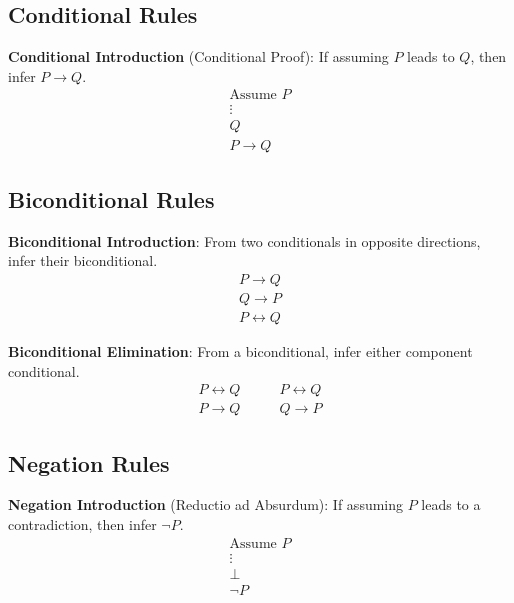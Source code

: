 \subsection{Conditional Rules}

\begin{definition}
\textbf{Conditional Introduction} (Conditional Proof): If assuming $P$ leads to
$Q$, then infer $P \rightarrow Q$.
\[
\begin{array}{l}
\text{Assume } P \\ \vdots \\ Q \\ \hline
P \rightarrow Q
\end{array}
\]
\end{definition}

\subsection{Biconditional Rules}

\begin{definition}
\textbf{Biconditional Introduction}: From two conditionals in opposite directions,
infer their biconditional.
\[
\begin{array}{l}
P \rightarrow Q \\
Q \rightarrow P \\ \hline
P \leftrightarrow Q
\end{array}
\]
\end{definition}

\begin{definition}
\textbf{Biconditional Elimination}: From a biconditional, infer either component
conditional.
\[
\begin{array}{l}
P \leftrightarrow Q \\ \hline
P \rightarrow Q
\end{array}
\qquad
\begin{array}{l}
P \leftrightarrow Q \\ \hline
Q \rightarrow P
\end{array}
\]
\end{definition}

\subsection{Negation Rules}

\begin{definition}
\textbf{Negation Introduction} (Reductio ad Absurdum): If assuming $P$ leads to
a contradiction, then infer $\neg P$.
\[
\begin{array}{l}
\text{Assume } P \\ \vdots \\ \bot \\ \hline
\neg P
\end{array}
\]
\end{definition}

